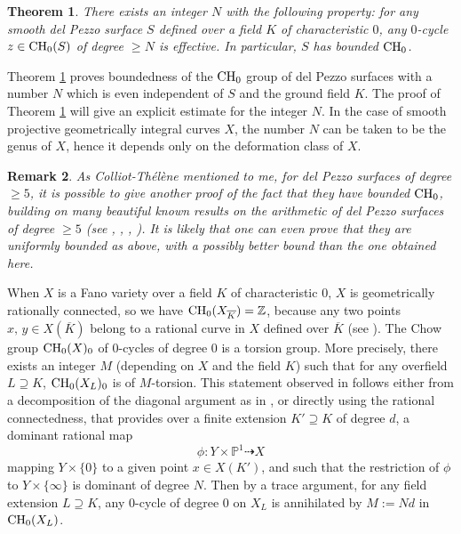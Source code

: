 \documentclass[10pt]{article}
\newtheorem{theo}{Theorem}[section]
\newtheorem{rema}[theo]{Remark}
\begin{document}
\begin{theo} \label{theocompletdp}  There exists an integer $N$ with the following property: for any    smooth del Pezzo surface $S$   defined over a field $K$ of characteristic $0$,  any $0$-cycle $z\in {\rm CH}_0(S)$ of degree $\geq N$  is effective. In particular, $S$ has   bounded  ${\rm CH}_0$.
\end{theo}
Theorem \ref{theocompletdp} proves boundedness of   the ${\rm CH}_0$ group of  del Pezzo surfaces with a number $N$ which  is even independent of $S$ and the ground field $K$.
The proof of  Theorem \ref{theocompletdp} will give  an explicit estimate  for the integer $N$.  In the case of smooth projective geometrically integral curves $X$, the number $N$ can be taken to be  the genus of $X$, hence it depends only on the deformation class of $X$.
\begin{rema}{\rm  As Colliot-Th\'{e}l\`{e}ne mentioned to me, for del Pezzo surfaces of degree $\geq 5$, it is possible to  give another proof of the fact  that they have   bounded ${\rm CH}_0$, building on many beautiful  known results on the arithmetic of del Pezzo surfaces of degree $\geq 5$ (see \cite{VA}, \cite{caoyang}, \cite{krashen}, \cite{chernousov}). It is likely that one can even prove that they are  uniformly bounded as above, with a possibly  better bound than the one obtained here.}
\end{rema}




When $X$ is a Fano variety over a field $K$ of characteristic $0$, $X$ is geometrically rationally connected, so we have ${\rm CH}_0(X_{\overline{K}})=\mathbb{Z}$, because any two points $x,\,y\in X(\overline{K})$ belong to  a rational curve in $X$ defined over $\overline{K}$ (see \cite{komimo}). The Chow group
${\rm CH}_0(X)_0$ of $0$-cycles of degree $0$ is a torsion group. More precisely, there exists an integer $M$ (depending on $X$ and the field $K$) such that
for any overfield  $L\supseteq K$, ${\rm CH}_0(X_L)_{0}$ is of $M$-torsion. This statement observed in \cite[Proposition 11]{CTinvent2005} follows either  from a decomposition of the diagonal argument as in \cite{blochsri}, or directly using  the rational connectedness, that provides over a finite extension   $K'\supseteq K $ of degree $d$,  a dominant rational map
$$\phi: Y\times \mathbb{P}^1\dashrightarrow X$$
 mapping $Y\times\{0\}$ to a given point $x\in X(K')$, and such that the restriction of $\phi$ to $Y\times \{\infty\}$ is dominant of degree $N$. Then by a trace argument, for any field extension $L\supseteq K$,  any $0$-cycle of degree $0$ on $X_L$ is annihilated  by $M:=Nd$ in ${\rm CH}_0(X_L)$.
\end{document}
